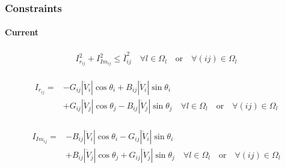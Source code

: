 \documentclass[
	11pt, %
	aspectratio=169, %
]{beamer}
\begin{document}

\begin{frame}
	\frametitle{Constraints}
	\framesubtitle{Current} %

	\begin{align}
		I_{r_{ij}}^{2}+ I_{Im_{ij}}^{2} \leq \overline{I}_{ij}^{2} \quad   \forall l \in \Omega_{l} \quad \text{or} \quad \forall (ij) \in \Omega_{l}
	\end{align}

	\begin{align}
		\begin{split}
	 		I_{r_{ij}} = &-G_{ij}\left\lvert \dot{V}_{i} \right\rvert \cos{\theta_{i}} + B_{ij}\left\lvert \dot{V}_{i} \right\rvert \sin{\theta_{i}} \\
					&+ G_{ij}\left\lvert \dot{V}_{j} \right\rvert \cos{\theta_{j}} - B_{ij}\left\lvert \dot{V}_{j} \right\rvert \sin{\theta_{j}} \quad \forall l \in \Omega_{l} \quad \text{or} \quad \forall (ij) \in \Omega_{l}
		\end{split}
	\end{align}

	\begin{align}
		\begin{split}
	 		I_{Im_{ij}} = &-B_{ij}\left\lvert \dot{V}_{i} \right\rvert \cos{\theta_{i}} - G_{ij}\left\lvert \dot{V}_{i} \right\rvert \sin{\theta_{i}} \\
			&+ B_{ij}\left\lvert \dot{V}_{j} \right\rvert \cos{\theta_{j}} + G_{ij}\left\lvert \dot{V}_{j} \right\rvert \sin{\theta_{j}} \quad \forall l \in \Omega_{l} \quad \text{or} \quad \forall (ij) \in \Omega_{l}
		\end{split}
	\end{align}

	
\end{frame}

\end{document}
